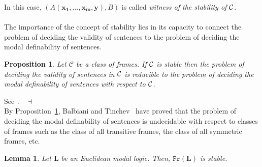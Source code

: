 \documentclass[draft]{article}
\newtheorem{lemma}{Lemma}
\newtheorem{proposition}{Proposition}
\newenvironment{proof}{{\bf Proof:}}{~$\dashv$\\}
\def\Fr{\mathtt{Fr}}
\def\L{\mathbf{L}}
\begin{document}
%
%
In this case, $(A(\mathbf{x_{1}},\ldots,\mathbf{x_{m}},\mathbf{y}),B)$ is called {\it witness of the stability of ${\cal C}$.}
%
%
\\
\\
%
%
The importance of the concept of stability lies in its capacity to connect the problem of deciding the validity of sentences to the problem of deciding the modal definability of sentences.
%
%
\begin{proposition}\label{Validity:And:Definability}
%
%
Let ${\mathcal C}$ be a class of frames.
If ${\cal C}$ is stable then the problem of deciding the validity of sentences in ${\cal C}$ is reducible to the problem of deciding the modal definability of sentences with respect to ${\cal C}$.
%
%
\end{proposition}
%
%
\begin{proof}
%
%
See~\cite{Balbiani:Tinchev:2017,Balbiani:Tinchev:2019}.
%
%
\medskip
%
%
\end{proof}
%
%
By Proposition~\ref{Validity:And:Definability}, Balbiani and Tinchev~\cite{Balbiani:Tinchev:2017,Balbiani:Tinchev:2019} have proved that the problem of deciding the modal definability of sentences is undecidable with respect to classes of frames such as the class of all transitive frames, the class of all symmetric frames, etc.
%
%
\begin{lemma}\label{lemma:L:modal:logic:Fr:L:is:stable}
%
%
Let $\L$ be an Euclidean modal logic.
Then, $\Fr(\L)$ is stable.
%
%
\end{lemma}
%
%
\end{document}
